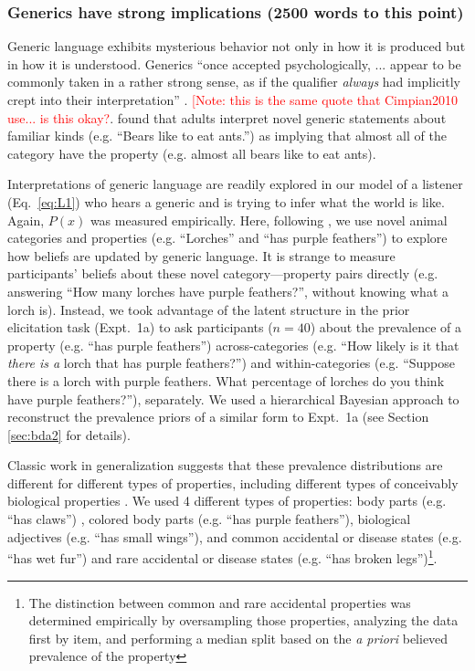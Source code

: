 \documentclass[10pt,letterpaper]{article}
\newcommand{\red}[1]{\textcolor{Red}{#1}}
\begin{document}
\subsubsection{Generics have strong implications (2500 words to this point)} 

Generic language exhibits mysterious behavior not only in how it is produced but in how it is understood.
Generics ``once accepted psychologically, ... appear to be commonly taken in a rather strong sense, as if the qualifier \emph{always} had implicitly crept into their interpretation'' \cite{Abelson1966}. \red{[Note: this is the same quote that Cimpian2010 use... is this okay?}.
%
 found that adults interpret novel generic statements about familiar kinds (e.g. ``Bears like to eat ants.'') as implying that almost all of the category have the property (e.g. almost all bears like to eat ants).

Interpretations of generic language are readily explored in our model of a listener (Eq.~\ref{eq:L1}) who hears a generic and is trying to infer what the world is like. 
Again, $P(x)$ was measured empirically.
Here, following , we use novel animal categories and properties (e.g. ``Lorches'' and ``has purple feathers'') to explore how beliefs are updated by generic language. 
It is strange to measure participants' beliefs about these novel category---property pairs directly (e.g. answering ``How many lorches have purple feathers?'', without knowing what a lorch is).
Instead, we took advantage of the latent structure in the prior elicitation task (Expt.~1a) to ask participants ($n=40$) about the prevalence of a property (e.g. ``has purple feathers'') across-categories (e.g. ``How likely is it that \emph{there is a} lorch that has purple feathers?'') and within-categories (e.g. ``Suppose there is a lorch with purple feathers. What percentage of lorches do you think have purple feathers?''), separately. 
We used a hierarchical Bayesian approach to reconstruct the prevalence priors of a similar form to Expt.~1a (see Section \ref{sec:bda2} for details).

Classic work in generalization suggests that these prevalence distributions are different for different types of properties, including different types of conceivably biological properties \cite{Nisbett1983}. 
We used 4 different types of properties: body parts (e.g. ``has claws'') , colored body parts (e.g. ``has purple feathers''), biological adjectives (e.g. ``has small wings''), and common accidental or disease states (e.g. ``has wet fur'') and rare accidental or disease states (e.g. ``has broken legs'')\footnote{The distinction between common and rare accidental properties was determined empirically by oversampling those properties, analyzing the data first by item, and performing a median split based on the \emph{a priori} believed prevalence of the property}.
\end{document}
